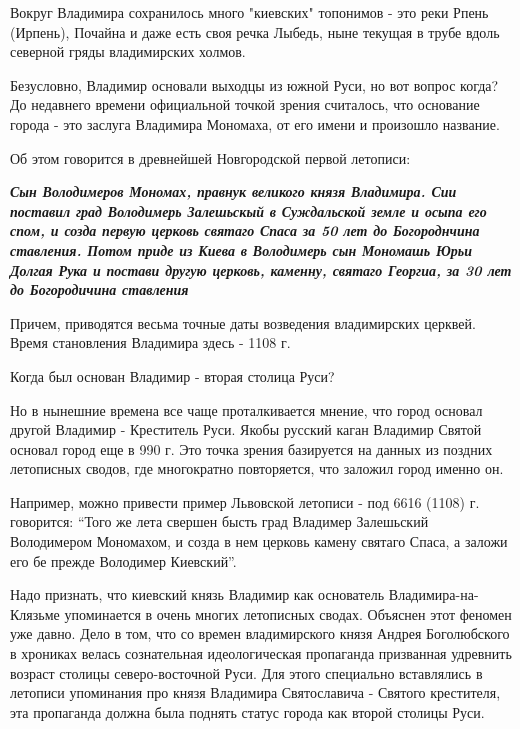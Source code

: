 Вокруг Владимира сохранилось много "киевских" топонимов - это реки Рпень
(Ирпень), Почайна и даже есть своя речка Лыбедь, ныне текущая в трубе вдоль
северной гряды владимирских холмов.

Безусловно, Владимир основали выходцы из южной Руси, но вот вопрос когда?  До
недавнего времени официальной точкой зрения считалось, что основание города -
это заслуга Владимира Мономаха, от его имени и произошло название.

Об этом говорится в древнейшей Новгородской первой летописи: 

\begin{leftbar}
  \begingroup
    \em\Large\bfseries\color{blue}
Сын Володимеров Мономах, правнук великого князя Владимира. Сии поставил град
Володимерь Залешьскый в Суждальской земле и осыпа его спом, и созда первую
церковь святаго Спаса за 50 лет до Богороднчина ставления. Потом приде из Киева
в Володимерь сын Мономашь Юрьи Долгая Рука и постави другую церковь, каменну,
святаго Георгиа, за 30 лет до Богородичина ставления
  \endgroup
\end{leftbar}

Причем, приводятся весьма точные даты возведения владимирских церквей.
Время становления Владимира здесь - 1108 г.

Когда был основан Владимир - вторая столица Руси?

Но в нынешние времена все чаще проталкивается мнение, что город основал
другой Владимир - Креститель Руси. Якобы русский каган Владимир Святой
основал город еще в 990 г. Это точка зрения базируется на данных из
поздних летописных сводов, где многократно повторяется, что заложил город
именно он.

Например, можно привести пример Львовской летописи - под 6616 (1108) г.
говорится: “Того же лета свершен бысть град Владимер Залешьский
Володимером Мономахом, и созда в нем церковь камену святаго Спаса, а
заложи его бе прежде Володимер Киевский”.

Надо признать, что киевский князь Владимир как основатель
Владимира-на-Клязьме упоминается в очень многих летописных сводах.
Объяснен этот феномен уже давно. Дело в том, что со времен владимирского
князя Андрея Боголюбского в хрониках велась сознательная идеологическая
пропаганда призванная удревнить возраст столицы северо-восточной Руси. Для
этого специально вставлялись в летописи упоминания про князя Владимира
Святославича - Святого крестителя, эта пропаганда должна была поднять
статус города как второй столицы Руси.

